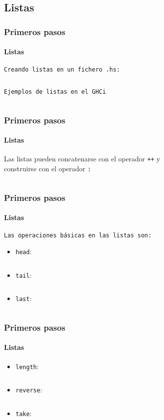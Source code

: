 \subsection{Listas}
\begin{frame}[fragile]
  \frametitle{Primeros pasos}
  \framesubtitle{Listas}
  \texttt{Creando listas en un fichero \verb~.hs~:}
  {\color{white}
    \inputminted[bgcolor=bg]{haskell}{code/primeras_funciones02.hs}
  }
  \texttt{Ejemplos de listas en el GHCi}
  {\color{white}
    \inputminted[bgcolor=bg]{text}{code/primeras_funciones03.txt}
  }
\end{frame}

\begin{frame}[fragile]
  \frametitle{Primeros pasos}
  \framesubtitle{Listas}
  Las listas pueden concatenarse con el operador \verb~++~ y\\construirse con el operador \verb~:~
  {\color{white}
    \inputminted[bgcolor=bg]{text}{code/primeras_funciones04.txt}
  }
\end{frame}

\begin{frame}[fragile]
  \frametitle{Primeros pasos}
  \framesubtitle{Listas}
  \texttt{Las operaciones básicas en las listas son:}
  \begin{itemize}
  \item \verb~head~:
    {\color{white}
      \inputminted[bgcolor=bg]{text}{code/primeras_funciones05.txt}
    }
  \item \verb~tail~:
    {\color{white}
      \inputminted[bgcolor=bg]{text}{code/primeras_funciones06.txt}
    }
  \item \verb~last~:
    {\color{white}
      \inputminted[bgcolor=bg]{text}{code/primeras_funciones07.txt}
    }
  \end{itemize}
\end{frame}

\begin{frame}[fragile]
  \frametitle{Primeros pasos}
  \framesubtitle{Listas}
  \begin{itemize}
  \item \verb~length~:
    {\color{white}
      \inputminted[bgcolor=bg]{text}{code/primeras_funciones09.txt}
    }
  \item \verb~reverse~:
    {\color{white}
      \inputminted[bgcolor=bg]{text}{code/primeras_funciones10.txt}
    }
  \item \verb~take~:
    {\color{white}
      \inputminted[bgcolor=bg]{text}{code/primeras_funciones11.txt}
    }
  \end{itemize}
\end{frame}

